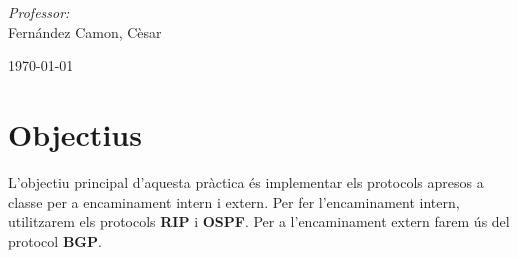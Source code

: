 \documentclass[10pt]{article}
\begin{document}
\begin{center}
\begin{minipage}{0.46\textwidth}
\begin{flushleft}
\end{flushleft}                                                                     %
\end{minipage}      
\begin{minipage}{0.52\textwidth}        
\vspace{-0.6cm}                                         %
\begin{flushright} \large                                                           %
\emph{Professor:} \\                                                                 %
Fernández Camon, Cèsar                                                    %
\end{flushright}                                                                    %
\end{minipage}  
\vspace*{1cm}
    

\begin{center}                                                                                  
{\large \today}                                                                 %
            \end{center}                                                                        
\end{center}                                                                        
                                                                                    
\newpage                                                                        

\tableofcontents
\listoffigures 
\listoftables

\newpage
\section{Objectius}
L'objectiu principal d'aquesta pràctica és implementar els protocols apresos a classe per a encaminament intern i extern. Per fer l'encaminament intern, utilitzarem els protocols \textbf{RIP} i \textbf{OSPF}. Per a l'encaminament extern farem ús del protocol \textbf{BGP}.
\end{document}
